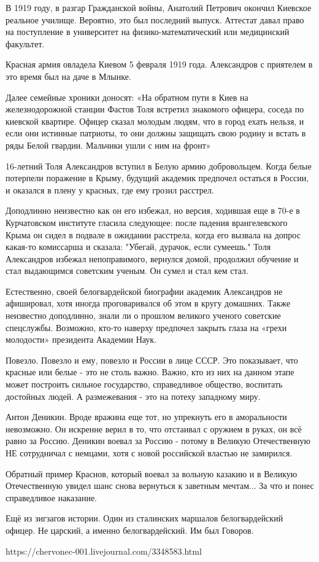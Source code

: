 В 1919 году, в разгар Гражданской войны, Анатолий Петрович окончил Киевское
реальное училище. Вероятно, это был последний выпуск. Аттестат давал право на
поступление в университет на физико-математический или медицинский факультет.

Красная армия овладела Киевом 5 февраля 1919 года. Александров с приятелем в
это время был на даче в Млынке.

Далее семейные хроники доносят: «На обратном пути в Киев на железнодорожной
станции Фастов Толя встретил знакомого офицера, соседа по киевской квартире.
Офицер сказал молодым людям, что в город ехать нельзя, и если они истинные
патриоты, то они должны защищать свою родину и встать в ряды Белой гвардии.
Мальчики ушли с ним на фронт»

16-летний Толя Александров вступил в Белую армию добровольцем. Когда белые
потерпели поражение в Крыму, будущий академик предпочел остаться в России, и
оказался в плену у красных, где ему грозил расстрел.

Доподлинно неизвестно как он его избежал, но версия, ходившая еще в 70-е в
Курчатовском институте гласила следующее: после падения врангелевского Крыма он
сидел в подвале в ожидании расстрела, когда его вызвала на допрос какая-то
комиссарша и сказала: "Убегай, дурачок, если сумеешь." Толя Александров избежал
непоправимого, вернулся домой, продолжил обучение и стал выдающимся советским
ученым. Он сумел и стал кем стал.

Естественно, своей белогвардейской биографии академик Александров не
афишировал, хотя иногда проговаривался об этом в кругу домашних. Также
неизвестно доподлинно, знали ли о прошлом великого ученого советские
спецслужбы. Возможно, кто-то наверху предпочел закрыть глаза на «грехи
молодости» президента Академии Наук.

Повезло. Повезло и ему, повезло и России в лице СССР.  Это показывает, что
красные или белые - это не столь важно. Важно, кто из них на данном этапе может
построить сильное государство, справедливое общество, воспитать достойных
людей. А размежевания - это на потеху западному миру.

Антон Деникин. Вроде вражина еще тот, но упрекнуть его в аморальности
невозможно. Он искренне верил в то, что отстаивал с оружием в руках, он всё
равно за Россию. Деникин воевал за Россию - потому в Великую Отечественную НЕ
сотрудничал с немцами, хотя с новой российской властью не замирился.

Обратный пример Краснов, который воевал за вольную казакию и в Великую
Отечественную увидел шанс снова вернуться к заветным мечтам... За что и понес
справедливое наказание.

Ещё из зигзагов истории. Один из сталинских маршалов белогвардейский офицер. Не
царский, а именно белогвардейский. Им был Говоров.

https://chervonec-001.livejournal.com/3348583.html
  
